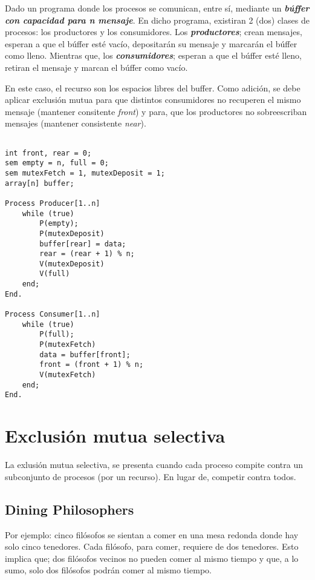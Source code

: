 \documentclass[a4paper, 10pt]{report}
\begin{document}
Dado un programa donde los procesos se comunican, entre sí, mediante un \textbf{\emph{búffer con capacidad para n mensaje}}. En dicho programa, existiran 2 (dos) clases de procesos: los productores y los consumidores. Los \textbf{\emph{productores}}; crean mensajes, esperan a que el búffer esté vacío, depositarán su mensaje y marcarán el búffer como lleno. Mientras que, los \textbf{\emph{consumidores}}; esperan a que el búffer esté lleno, retiran el mensaje y marcan el búffer como vacío.

En este caso, el recurso son los espacios libres del buffer. Como adición, se debe aplicar exclusión mutua para que distintos consumidores no recuperen el mismo mensaje (mantener consitente \emph{front}) y para, que los productores no sobreescriban mensajes (mantener consistente \emph{near}).

\begin{lstlisting}[multicols=2]

int front, rear = 0;
sem empty = n, full = 0;
sem mutexFetch = 1, mutexDeposit = 1;
array[n] buffer; 

Process Producer[1..n]
    while (true)
        P(empty);
        P(mutexDeposit)
        buffer[rear] = data;
        rear = (rear + 1) % n;
        V(mutexDeposit)
        V(full)
    end;
End.

Process Consumer[1..n]
    while (true)
        P(full);
        P(mutexFetch)
        data = buffer[front];
        front = (front + 1) % n;
        V(mutexFetch)
    end;
End.
\end{lstlisting}

\section{Exclusión mutua selectiva}

La exlusión mutua selectiva, se presenta cuando cada proceso compite contra un subconjunto de procesos (por un recurso). En lugar de, competir contra todos.

\subsection{Dining Philosophers}

Por ejemplo: cinco filósofos se sientan a comer en una mesa redonda donde hay solo cinco tenedores. Cada filósofo, para comer, requiere de dos tenedores. Esto implica que; dos filósofos vecinos no pueden comer al mismo tiempo y que, a lo sumo, solo dos filósofos podrán comer al mismo tiempo.
\end{document}
